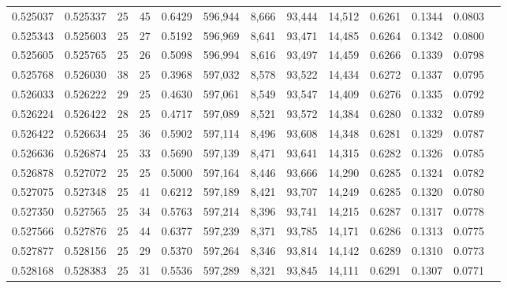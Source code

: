 \begin{tabular}{rrrrrrrrrrrrr}
0.525037 & 0.525337 &    25 &  45 &                                     0.6429 & 596,944 &   8,666 &  93,444 &  14,512 & 0.6261 & 0.1344 & 0.0803 \\
0.525343 & 0.525603 &    25 &  27 &                                     0.5192 & 596,969 &   8,641 &  93,471 &  14,485 & 0.6264 & 0.1342 & 0.0800 \\
0.525605 & 0.525765 &    25 &  26 &                                     0.5098 & 596,994 &   8,616 &  93,497 &  14,459 & 0.6266 & 0.1339 & 0.0798 \\
0.525768 & 0.526030 &    38 &  25 &                                     0.3968 & 597,032 &   8,578 &  93,522 &  14,434 & 0.6272 & 0.1337 & 0.0795 \\
0.526033 & 0.526222 &    29 &  25 &                                     0.4630 & 597,061 &   8,549 &  93,547 &  14,409 & 0.6276 & 0.1335 & 0.0792 \\
0.526224 & 0.526422 &    28 &  25 &                                     0.4717 & 597,089 &   8,521 &  93,572 &  14,384 & 0.6280 & 0.1332 & 0.0789 \\
0.526422 & 0.526634 &    25 &  36 &                                     0.5902 & 597,114 &   8,496 &  93,608 &  14,348 & 0.6281 & 0.1329 & 0.0787 \\
0.526636 & 0.526874 &    25 &  33 &                                     0.5690 & 597,139 &   8,471 &  93,641 &  14,315 & 0.6282 & 0.1326 & 0.0785 \\
0.526878 & 0.527072 &    25 &  25 &                                     0.5000 & 597,164 &   8,446 &  93,666 &  14,290 & 0.6285 & 0.1324 & 0.0782 \\
0.527075 & 0.527348 &    25 &  41 &                                     0.6212 & 597,189 &   8,421 &  93,707 &  14,249 & 0.6285 & 0.1320 & 0.0780 \\
0.527350 & 0.527565 &    25 &  34 &                                     0.5763 & 597,214 &   8,396 &  93,741 &  14,215 & 0.6287 & 0.1317 & 0.0778 \\
0.527566 & 0.527876 &    25 &  44 &                                     0.6377 & 597,239 &   8,371 &  93,785 &  14,171 & 0.6286 & 0.1313 & 0.0775 \\
0.527877 & 0.528156 &    25 &  29 &                                     0.5370 & 597,264 &   8,346 &  93,814 &  14,142 & 0.6289 & 0.1310 & 0.0773 \\
0.528168 & 0.528383 &    25 &  31 &                                     0.5536 & 597,289 &   8,321 &  93,845 &  14,111 & 0.6291 & 0.1307 & 0.0771 \\

\end{tabular}
